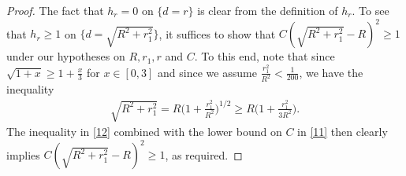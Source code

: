 \documentclass[10pt,a4paper]{amsart}
\begin{document}
\begin{proof}
	The fact that $h_r = 0$ on $\{d=r\}$ is clear from the definition of $h_r$. To see that $h_r \geq 1$ on $\{d=\sqrt{R^2+r_1^2}\}$, it suffices to show that $C(\sqrt{R^2 + r_1^2} - R)^2 \geq 1$ under our hypotheses on $R, r_1, r$ and $C$. To this end, note that since $\sqrt{1+x} \geq 1 + \frac{x}{3}$ for $x\in[0,3]$ and since we assume $\frac{r_1^2}{R^2}< \frac{1}{200}$, we have the inequality
	\begin{align}\label{12}
	\sqrt{R^2 + r_1^2} = R\bigg(1+ \frac{r_1^2}{R^2}\bigg)^{1/2} \geq R\bigg(1+\frac{r_1^2}{3R^2}\bigg).
	\end{align}
	The inequality in \eqref{12} combined with the lower bound on $C$ in \eqref{11} then clearly implies $C(\sqrt{R^2 + r_1^2} - R)^2 \geq 1$, as required.\medskip 
	
	
	

\end{proof}
\end{document}
